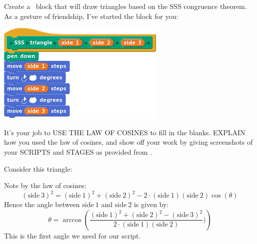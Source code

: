 \documentclass[noauthor,nooutcomes,12pt]{ximera}
\begin{document}
\begin{question}
  Create a \snap\ block that will draw triangles based on the SSS
  congruence theorem.  As a gesture of friendship, I've started the
  block for you:
  \begin{center}
    \includegraphics{sssBlockBLANK}
  \end{center}
  It's your job to USE THE LAW OF COSINES to fill in the
  blanks. EXPLAIN how you used the law of cosines, and show off your
  work by giving screenshots of your SCRIPTS and STAGES as provided
  from \snap.
  \begin{freeResponse}
    Consider this triangle:
    \begin{center}
      \end{center}


    
    Note by the law of cosines:
    \[
    (\mathrm{side~3})^2 = (\mathrm{side~1})^2 + (\mathrm{side~2})^2 - 2\cdot (\mathrm{side~1})(\mathrm{side~2})\cos(\theta)
    \]
    Hence the angle between $\mathrm{side~1}$ and $\mathrm{side~2}$ is given by:
    \[
    \theta = \arccos\left(\frac{(\mathrm{side~1})^2 + (\mathrm{side~2})^2- (\mathrm{side~3})^2}{2\cdot (\mathrm{side~1})(\mathrm{side~2})})\right) 
    \]
    This is the first angle we need for our script.


\end{freeResponse}
\end{question}
\end{document}
